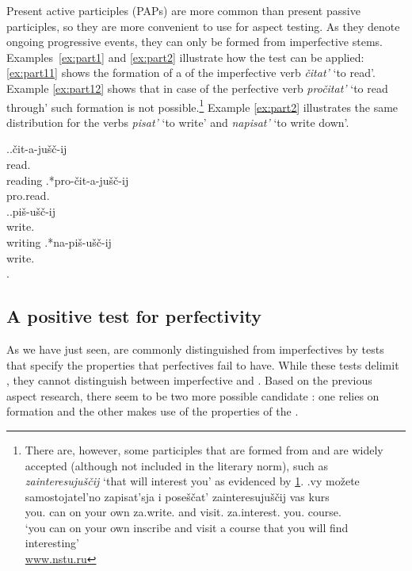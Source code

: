 Present active participles  (PAPs) are more common than present passive participles, so they are more convenient to use for aspect testing. As they denote ongoing progressive events, they can only be formed from imperfective stems. Examples~\ref{ex:part1} and \ref{ex:part2} illustrate how the test can be applied: \ref{ex:part11} shows the formation of a  of the imperfective verb \textit{\v{c}itat'} `to read'. Example \ref{ex:part12} shows that in case of the perfective verb \textit{pro\v{c}itat'} `to read through' such formation is not possible.\footnote{There are, however, some participles that are formed from  and are widely accepted (although not included in the literary norm), such as \textit{zainteresuju\v{s}\v{c}ij} `that will interest you' as evidenced by \ref{ex:PFP}.
\exg.\label{ex:PFP}vy mo\v{z}ete samostojatel'no zapisat'sja i pose\v{s}\v{c}at' zainteresuju\v{s}\v{c}ij vas kurs\\
you. can {on your own} za.write. and visit. za.interest. you. course.\\
\trans `you can on your own inscribe and visit a course that you will find interesting'\\\hbox{} \hfill \hbox{\url{www.nstu.ru}}

} Example \ref{ex:part2} illustrates the same distribution for the verbs \textit{pisat'}\textsuperscript{\IPF} `to write' and \textit{napisat'}\textsuperscript{\PF} `to write down'.

\ex.\label{ex:part1}\ag.\label{ex:part11}\v{c}it-a-ju\v{s}\v{c}-ij\\
read\textsuperscript{\IPF}.\\
reading
\bg.\label{ex:part12}*pro-\v{c}it-a-ju\v{s}\v{c}-ij\\
pro.read\textsuperscript{\PF}.\\

\ex.\label{ex:part2}\ag.\label{ex:part21}pi\v{s}-u\v{s}\v{c}-ij\\
write\textsuperscript{\IPF}.\\
writing
\bg.\label{ex:part22}*na-pi\v{s}-u\v{s}\v{c}-ij\\
write\textsuperscript{\PF}.\\
\z.


\subsection{A positive test for perfectivity}\label{sec:tests:new}\largerpage
As we have just seen,  are commonly distinguished from imperfectives by tests that specify the properties that perfectives fail to have. While these tests delimit , they cannot distinguish between imperfective and . Based on the previous aspect research, there seem to be two more possible candidate : one relies on  formation and the other makes use of the properties of the . %

